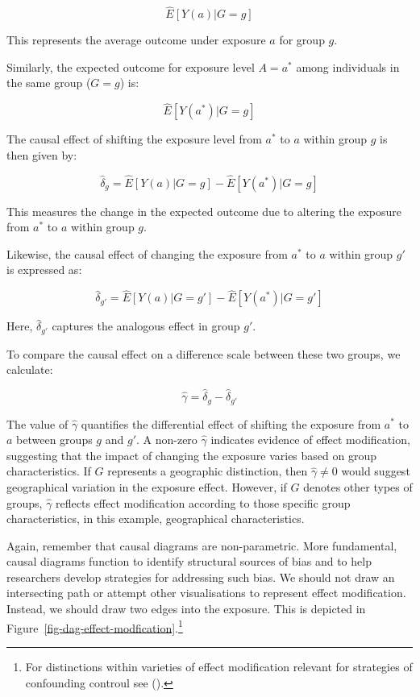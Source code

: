 \documentclass[
  singlecolumn,
  9pt]{article}
\begin{document}
\[\hat{E}[Y(a)|G=g]\]

This represents the average outcome under exposure \(a\) for group
\(g\).

Similarly, the expected outcome for exposure level \(A = a^*\) among
individuals in the same group (\(G = g\)) is:

\[\hat{E}[Y(a^*)|G=g]\]

The causal effect of shifting the exposure level from \(a^*\) to \(a\)
within group \(g\) is then given by:

\[\hat{\delta}_g = \hat{E}[Y(a)|G=g] - \hat{E}[Y(a^*)|G=g]\]

This measures the change in the expected outcome due to altering the
exposure from \(a^*\) to \(a\) within group \(g\).

Likewise, the causal effect of changing the exposure from \(a^*\) to
\(a\) within group \(g'\) is expressed as:

\[\hat{\delta}_{g'} = \hat{E}[Y(a)|G=g'] - \hat{E}[Y(a^*)|G=g']\]

Here, \(\hat{\delta}_{g'}\) captures the analogous effect in group
\(g'\).

To compare the causal effect on a difference scale between these two
groups, we calculate:

\[\hat{\gamma} = \hat{\delta}_g - \hat{\delta}_{g'}\]

The value of \(\hat{\gamma}\) quantifies the differential effect of
shifting the exposure from \(a^*\) to \(a\) between groups \(g\) and
\(g'\). A non-zero \(\hat{\gamma}\) indicates evidence of effect
modification, suggesting that the impact of changing the exposure varies
based on group characteristics. If \(G\) represents a geographic
distinction, then \(\hat{\gamma} \neq 0\) would suggest geographical
variation in the exposure effect. However, if \(G\) denotes other types
of groups, \(\hat{\gamma}\) reflects effect modification according to
those specific group characteristics, in this example, geographical
characteristics.

Again, remember that causal diagrams are non-parametric. More
fundamental, causal diagrams function to identify structural sources of
bias and to help researchers develop strategies for addressing such
bias. We should not draw an intersecting path or attempt other
visualisations to represent effect modification. Instead, we should draw
two edges into the exposure. This is depicted in
Figure~\ref{fig-dag-effect-modfication}.\footnote{For distinctions
  within varieties of effect modification relevant for strategies of
  confounding controul see ().}
\end{document}

